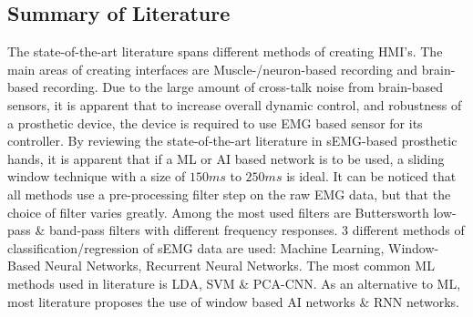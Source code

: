 \documentclass[../main.tex]{subfiles}
\begin{document}

\newpage
\subsection{Summary of Literature}

The state-of-the-art literature spans different methods of creating \gls{HMI}'s.
The main areas of creating interfaces are Muscle-/neuron-based recording and brain-based recording.
Due to the large amount of cross-talk noise from brain-based sensors, it is apparent that to increase overall dynamic control, and robustness of a prosthetic device, the device is required to use EMG based sensor for its controller.
By reviewing the state-of-the-art literature in \gls{sEMG}-based prosthetic hands, it is apparent that if a \gls{ML} or \gls{AI} based network is to be used, a sliding window technique with a size of $150ms$ to $250ms$ is ideal.
It can be noticed that all methods use a pre-processing filter step on the raw EMG data, but that the choice of filter varies greatly.
Among the most used filters are Buttersworth low-pass \& band-pass filters with different frequency responses.
3 different methods of classification/regression of sEMG data are used: Machine Learning, Window-Based Neural Networks, Recurrent Neural Networks.
The most common \gls{ML} methods used in literature is \gls{LDA}, \gls{SVM} \& PCA-CNN.
As an alternative to ML, most literature proposes the use of window based \gls{AI} networks \& \gls{RNN} networks.
\end{document}
